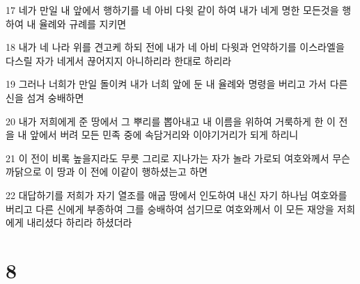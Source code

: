 \par 17 네가 만일 내 앞에서 행하기를 네 아비 다윗 같이 하여 내가 네게 명한 모든것을 행하여 내 율례와 규례를 지키면
\par 18 내가 네 나라 위를 견고케 하되 전에 내가 네 아비 다윗과 언약하기를 이스라엘을 다스릴 자가 네게서 끊어지지 아니하리라 한대로 하리라
\par 19 그러나 너희가 만일 돌이켜 내가 너희 앞에 둔 내 율례와 명령을 버리고 가서 다른 신을 섬겨 숭배하면
\par 20 내가 저희에게 준 땅에서 그 뿌리를 뽑아내고 내 이름을 위하여 거룩하게 한 이 전을 내 앞에서 버려 모든 민족 중에 속담거리와 이야기거리가 되게 하리니
\par 21 이 전이 비록 높을지라도 무릇 그리로 지나가는 자가 놀라 가로되 여호와께서 무슨 까닭으로 이 땅과 이 전에 이같이 행하셨는고 하면
\par 22 대답하기를 저희가 자기 열조를 애굽 땅에서 인도하여 내신 자기 하나님 여호와를 버리고 다른 신에게 부종하여 그를 숭배하여 섬기므로 여호와께서 이 모든 재앙을 저희에게 내리셨다 하리라 하셨더라

\chapter{8}

